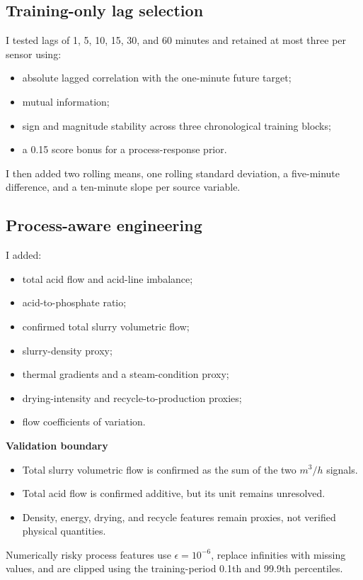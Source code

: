 \documentclass[10pt,a4paper]{article}
\begin{document}
\subsection*{Training-only lag selection}

I tested lags of 1, 5, 10, 15, 30, and 60 minutes and retained at most three per sensor using:
\begin{itemize}
  \item absolute lagged correlation with the one-minute future target;
  \item mutual information;
  \item sign and magnitude stability across three chronological training blocks;
  \item a 0.15 score bonus for a process-response prior.
\end{itemize}
I then added two rolling means, one rolling standard deviation, a five-minute difference, and a ten-minute slope per source variable.

\subsection*{Process-aware engineering}

I added:
\begin{itemize}
  \item total acid flow and acid-line imbalance;
  \item acid-to-phosphate ratio;
  \item confirmed total slurry volumetric flow;
  \item slurry-density proxy;
  \item thermal gradients and a steam-condition proxy;
  \item drying-intensity and recycle-to-production proxies;
  \item flow coefficients of variation.
\end{itemize}

\textbf{Validation boundary}
\begin{itemize}
  \item Total slurry volumetric flow is confirmed as the sum of the two $m^3/h$ signals.
  \item Total acid flow is confirmed additive, but its unit remains unresolved.
  \item Density, energy, drying, and recycle features remain proxies, not verified physical quantities.
\end{itemize}

Numerically risky process features use $\epsilon=10^{-6}$, replace infinities with missing values, and are clipped using the training-period 0.1th and 99.9th percentiles.
\end{document}
